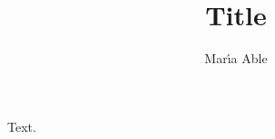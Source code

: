 \documentclass{amsart}
\begin{document}
\title{Title}
\author{Mar\'{\i}a Able}
\address{University of A}
\maketitle
Text.
\end{document}
